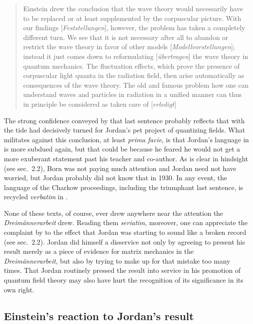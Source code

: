 \documentclass[12pt]{elsart}
\begin{document}
\begin{quotation}
Einstein drew the conclusion that the wave theory would necessarily have to be replaced or at least supplemented by the corpuscular picture. With our findings [{\it Feststellungen}], however, the problem has taken a completely different turn. We see that it is not necessary after all to abandon or restrict the wave theory in favor of other models [{\it Modellvorstellungen}]; instead it just comes down to reformulating [{\it \"ubertragen}] the wave theory in quantum mechanics. The fluctuation effects, which prove the presence of corpuscular light quanta in the radiation field, then arise automatically as consequences of the wave theory.  The old and famous problem how one can understand waves and particles in radiation in a unified manner can thus in principle be considered as taken care of [{\it erledigt}] \citep[p.\ 702]{Jordan 1929} 
\end{quotation}
The strong confidence conveyed by that last sentence probably reflects that with \citep{Dirac 1927} the tide had decisively turned for Jordan's pet project of quantizing fields. What militates against this conclusion, at least {\it prima facie}, is that Jordan's language in \citep[pp.\ 398--399]{Born and Jordan 1930} is more subdued again, but that could be because he feared he would not get a  more exuberant statement past his teacher and co-author. As is clear in hindsight (see sec.\ 2.2), Born was not paying much attention and Jordan need not have worried, but Jordan probably did not know that in 1930. In any event, the language of the Charkow proceedings, including the triumphant last sentence,  is recycled {\it verbatim} in \citep[p.\ 222]{Jordan 1936}. 

None of these texts, of course, ever drew anywhere near the attention the \break
{\it Dreim\"annerarbeit} drew. Reading them {\it seriatim}, moreover, one can appreciate the complaint by \citet{Pauli 1930}  to the effect that Jordan was starting to sound like a broken record (see sec.\ 2.2). Jordan did himself a disservice not only by agreeing to present his result merely as a piece of evidence for matrix mechanics in the {\it Dreim\"annerarbeit}, but also by trying to make up for that mistake too many times. That Jordan   routinely pressed the result into service in his promotion of quantum field theory may also have hurt the recognition of its significance in its own right. 

\subsection{Einstein's reaction to Jordan's result}
\end{document}

